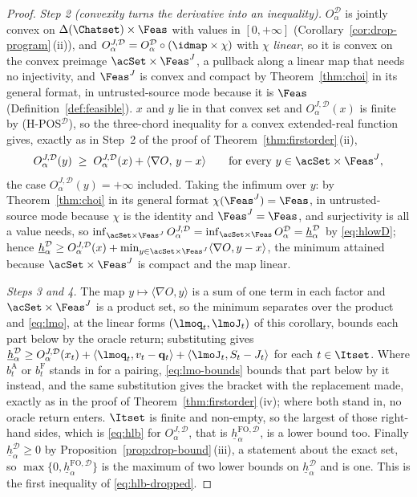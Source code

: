 \begin{proof}
\emph{Step 2 (convexity turns the derivative into an inequality).}
$O^{\mathcal{D}}_{\alpha}$ is jointly convex on $\Delta(\Chatset)\times\Feas$
with values in $[0,+\infty]$
(Corollary~\ref{cor:drop-program}\,(ii)), and
$O^{J,\mathcal{D}}_{\alpha}=O^{\mathcal{D}}_{\alpha}\circ(\idmap\times\chi)$
with $\chi$ \emph{linear}, so it is convex on the convex preimage
$\acSet\times\Feas^{J}$, a pullback along a linear map that needs no
injectivity, and $\Feas^{J}$ is convex and compact by
Theorem~\ref{thm:choi} in its general format, in untrusted-source mode
because it is $\Feas$ (Definition~\ref{def:feasible}). $x$ and $y$ lie in
that convex set and $O^{J,\mathcal{D}}_{\alpha}(x)$ is finite by
(H-POS$^{\mathcal{D}}$), so the three-chord inequality for a convex
extended-real function gives, exactly as in Step~2 of the proof of
Theorem~\ref{thm:firstorder}\,(ii),
\begin{equation}\label{eq:fo-subgrad-dropped}
  O^{J,\mathcal{D}}_{\alpha}(y)\;\ge\;O^{J,\mathcal{D}}_{\alpha}(x)
  +\langle\nabla O,\,y-x\rangle
  \qquad\text{for every }y\in\acSet\times\Feas^{J},
\end{equation}
the case $O^{J,\mathcal{D}}_{\alpha}(y)=+\infty$ included. Taking the infimum
over $y$: by Theorem~\ref{thm:choi} in its general format
$\chi(\Feas^{J})=\Feas$, in untrusted-source mode because $\chi$ is the
identity and $\Feas^{J}=\Feas$, and surjectivity is all a value needs, so
$\inf_{\acSet\times\Feas^{J}}O^{J,\mathcal{D}}_{\alpha}
=\inf_{\acSet\times\Feas}O^{\mathcal{D}}_{\alpha}
=\underline{h}^{\mathcal{D}}_{\alpha}$ by \eqref{eq:hlowD}; hence
$\underline{h}^{\mathcal{D}}_{\alpha}\ge O^{J,\mathcal{D}}_{\alpha}(x)
+\min_{y\in\acSet\times\Feas^{J}}\langle\nabla O,y-x\rangle$, the minimum
attained because $\acSet\times\Feas^{J}$ is compact and the map linear.

\emph{Steps 3 and 4.} The map $y\mapsto\langle\nabla O,y\rangle$ is a sum of
one term in each factor and $\acSet\times\Feas^{J}$ is a product set, so the
minimum separates over the product and \eqref{eq:lmo}, at the linear forms
$(\lmoq_t,\lmoJ_t)$ of this corollary, bounds each part below by the oracle
return; substituting gives
$\underline{h}^{\mathcal{D}}_{\alpha}\ge O^{J,\mathcal{D}}_{\alpha}(x_t)
+\langle\lmoq_t,v_t-\mathbf q_t\rangle+\langle\lmoJ_t,S_t-J_t\rangle$ for each
$t\in\Itset$. Where $b^{\mathrm A}_t$ or $b^{\mathrm F}_t$ stands in for a
pairing, \eqref{eq:lmo-bounds} bounds that part below by it instead, and
the same substitution gives the bracket with the replacement made, exactly
as in the proof of Theorem~\ref{thm:firstorder}\,(iv); where both stand in,
no oracle return enters. $\Itset$ is finite and non-empty, so the largest of those
right-hand sides, which is \eqref{eq:hlb} for
$O^{J,\mathcal{D}}_{\alpha}$, that is
$\underline{h}^{\mathrm{FO},\mathcal{D}}_{\alpha}$, is a lower bound too.
Finally $\underline{h}^{\mathcal{D}}_{\alpha}\ge0$ by
Proposition~\ref{prop:drop-bound}\,(iii), a statement about
the exact set, so $\max\{0,
\underline{h}^{\mathrm{FO},\mathcal{D}}_{\alpha}\}$ is the maximum of two lower
bounds on $\underline{h}^{\mathcal{D}}_{\alpha}$ and is one. This is the first
inequality of \eqref{eq:hlb-dropped}.


\end{proof}
